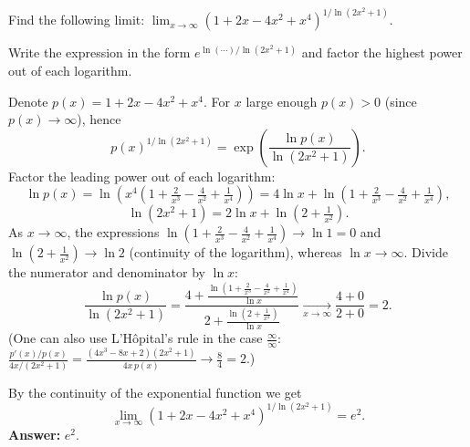 
\begin{question}
Find the following limit:
$\displaystyle \lim_{x\to\infty}\left(1+2x-4x^2+x^4\right)^{1/\ln(2x^2+1)}$.
\end{question}

\begin{hint}
Write the expression in the form $e^{\ln(\cdots)/\ln(2x^2+1)}$ and factor the highest power out of each logarithm.
\end{hint}

\begin{solution}
Denote $p(x)=1+2x-4x^2+x^4$. For $x$ large enough $p(x)>0$ (since $p(x)\to\infty$), hence
\[ p(x)^{1/\ln(2x^2+1)} = \exp\left(\frac{\ln p(x)}{\ln(2x^2+1)}\right). \]
Factor the leading power out of each logarithm:
\[ \ln p(x) = \ln\left(x^4\left(1+\tfrac{2}{x^3}-\tfrac{4}{x^2}+\tfrac{1}{x^4}\right)\right) = 4\ln x + \ln\left(1+\tfrac{2}{x^3}-\tfrac{4}{x^2}+\tfrac{1}{x^4}\right), \]
\[ \ln(2x^2+1) = 2\ln x + \ln\left(2+\tfrac{1}{x^2}\right). \]
As $x\to\infty$, the expressions $\ln\left(1+\tfrac{2}{x^3}-\tfrac{4}{x^2}+\tfrac{1}{x^4}\right)\to \ln 1 = 0$ and $\ln\left(2+\tfrac1{x^2}\right)\to\ln 2$ (continuity of the logarithm), whereas $\ln x\to\infty$. Divide the numerator and denominator by $\ln x$:
\[ \frac{\ln p(x)}{\ln(2x^2+1)} = \frac{4 + \frac{\ln\left(1+\frac{2}{x^3}-\frac{4}{x^2}+\frac{1}{x^4}\right)}{\ln x}}{2+\frac{\ln\left(2+\frac{1}{x^2}\right)}{\ln x}} \xrightarrow[x\to\infty]{} \frac{4+0}{2+0}=2. \]
(One can also use L'Hôpital's rule in the case $\frac{\infty}{\infty}$: $\frac{p'(x)/p(x)}{4x/(2x^2+1)}=\frac{(4x^3-8x+2)(2x^2+1)}{4x\,p(x)}\to\frac{8}{4}=2$.)

By the continuity of the exponential function we get
\[ \lim_{x\to\infty}\left(1+2x-4x^2+x^4\right)^{1/\ln(2x^2+1)} = e^{2}. \]
\textbf{Answer:} $e^2$.
\end{solution}
